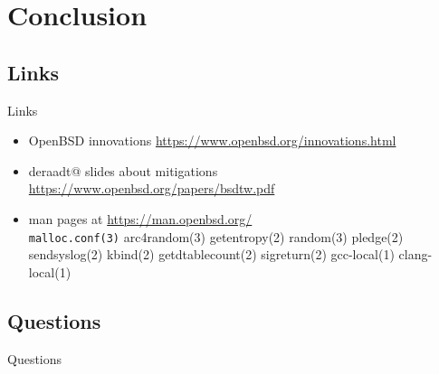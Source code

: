 \documentclass[14pt]{beamer}
\begin{document}
\section{Conclusion}

\subsection{Links}
\begin{frame}{Links}
\begin{itemize}
    \item OpenBSD innovations
	{\small \url{https://www.openbsd.org/innovations.html}}
    \item deraadt@ slides about mitigations
	{\small \url{https://www.openbsd.org/papers/bsdtw.pdf}}
    \item man pages at {\small \url{https://man.openbsd.org/}}\\
	\texttt{malloc.conf(3)}
	arc4random(3)
	getentropy(2)
	random(3)
	pledge(2)
	sendsyslog(2)
	kbind(2)
	getdtablecount(2)
	sigreturn(2)
	gcc-local(1)
	clang-local(1)
\end{itemize}
\end{frame}

\subsection{Questions}
\begin{frame}{Questions}
\begin{center}
\end{center}
\end{frame}
\end{document}
